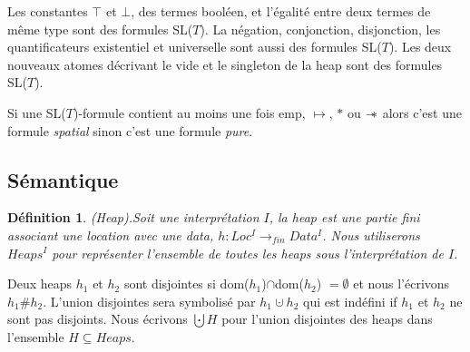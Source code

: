 \documentclass[9pt]{book}
\newcommand\sepimp{\mathrel{-\mkern-6mu*}}
\newtheorem{definition}{D\'efinition}[section]
\begin{document}
	Les constantes $\top$ et $\bot$, des termes bool\'een, et l'\'egalit\'e entre deux termes de m\^eme type sont des formules SL($T$). La n\'egation, conjonction, disjonction, les quantificateurs existentiel et universelle sont aussi des formules SL($T$).
	Les deux nouveaux atomes d\'ecrivant le vide et le singleton de la heap sont des formules SL($T$).\par
	Si une SL($T$)-formule contient au moins une fois emp, $\mapsto$, $*$ ou $\sepimp$ alors c'est une formule \textit{spatial} sinon c'est une formule \textit{pure}.
	\subsection{S\'emantique}
	\begin{definition}
	(Heap).Soit une interpr\'etation $I$, la heap est une partie fini associant une location avec une data, $h : Loc^{I} \rightarrow_{fin} Data^{I}$. Nous utiliserons $Heaps^{I}$ pour repr\'esenter l'ensemble de toutes les heaps sous l'interpr\'etation de $I$.
	\end{definition}
	Deux heaps $h_{1}$ et $h_{2}$ sont disjointes si dom($h_{1}$)$\cap$dom($h_{2}$) $= \emptyset$ et nous l'\'ecrivons $h_{1}\#h_{2}$. L'union disjointes sera symbolis\'e par $h_{1}\cupdot h_{2}$ qui est ind\'efini if $h_{1}$ et $h_{2}$ ne sont pas disjoints. Nous \'ecrivons $\bigcupdot H$ pour l'union disjointes des heaps dans l'ensemble $H \subseteq Heaps$.
\end{document}

